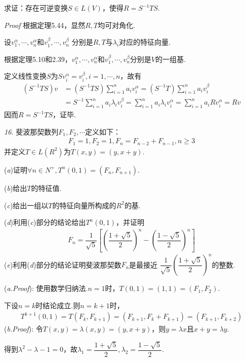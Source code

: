 求证：存在可逆变换\(S \in L(V)\)，使得\(R=S^{-1}TS\).

\textit{Proof}
根据定理5.44，显然\(R,T\)均可对角化.

设\(v_1^\alpha,\cdots,v_n^\alpha\)和\(v_1^\beta,\cdots,v_n^\beta\)
分别是\(R,T\)与\(\lambda_i\)对应的特征向量.

根据定理5.10和2.39，\(v_1^\alpha,\cdots,v_n^\alpha\)和\(v_1^\beta,\cdots,v_n^\beta\)分别是\(V\)的一组基.

定义线性变换\(S\)为\(Sv_i^\alpha=v_i^\beta,i=1,\cdots,n\)，故有
    \begin{align*}
        (S^{-1}TS)v &=(S^{-1}TS)\sum_{i=1}^n a_iv_i^\alpha=(S^{-1}T)\sum_{i=1}^n a_iv_i^\beta \\
                    &=S^{-1}\sum_{i=1}^n a_i\lambda_i v_i^\beta=\sum_{i=1}^n a_i\lambda_i v_i^\alpha
                     =\sum_{i=1}^n a_iRv_i^\alpha=Rv
    \end{align*}
因而\(R=S^{-1}TS\)，证毕.

\newpage

\textit{16.}
{\kaishu 斐波那契数列}\(F_1,F_2,\cdots\)定义如下：
    \begin{align*}
        F_1=1,F_2=1,F_n=F_{n-2}+F_{n-1},n \geq 3
    \end{align*}
并定义\(T \in L(R^2)\)为\(T(x,y)=(y,x+y)\).

(\textit{a})证明\(\forall n \in N^+,T^n(0,1)=(F_n,F_{n+1})\).

(\textit{b})给出\(T\)的特征值.

(\textit{c})给出一组以\(T\)的特征向量所构成的\(R^2\)的基.

(\textit{d})利用(\textit{c})部分的结论给出\(T^n(0,1)\)，并证明
    \begin{align*}
        F_n=\dfrac{1}{\sqrt{5}}[(\dfrac{1+\sqrt{5}}{2})^n-(\dfrac{1-\sqrt{5}}{2})^n]
    \end{align*}
(\textit{e})利用(\textit{d})部分的结论证明{\kaishu 斐波那契数}\(F_n\)是最接近
\(\dfrac{1}{\sqrt{5}}(\dfrac{1+\sqrt{5}}{2})^n\)的整数.

(\textit{a.Proof}):
使用数学归纳法.\(n=1\)时，\(T(0,1)=(1,1)=(F_1,F_2)\).

下设\(n=k\)时结论成立.则\(n=k+1\)时，
    \begin{align*}
        T^{k+1}(0,1)=T(F_k,F_{k+1})=(F_{k+1},F_k+F_{k+1})=(F_{k+1},F_{k+2})
    \end{align*}
(\textit{b.Proof}):
令\(T(x,y)=\lambda(x,y)=(y,x+y)\)，则\(y=\lambda x\)且\(x+y=\lambda y\).

得到\(\lambda^2-\lambda-1=0\)，故\(\lambda_1=\dfrac{1+\sqrt{5}}{2},\lambda_2=\dfrac{1-\sqrt{5}}{2}\).


